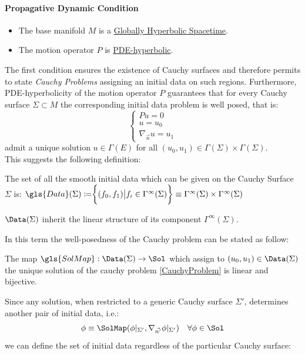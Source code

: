 \documentclass[Main]{subfiles}
\begin{document}
		\paragraph{Propagative Dynamic Condition}
		\begin{itemize}
			 \item The base manifold $M$ is a \underline{Globally Hyperbolic Spacetime}.
			 \item The motion operator $P$ is \underline{PDE-hyperbolic}.
		\end{itemize}
		The first condition ensures the existence of Cauchy surfaces and therefore permits to state  \emph{Cauchy Problems} assigning an initial data on such regions.
		Furthermore, PDE-hyperbolicity of the motion operator $P$ guarantees that for every Cauchy surface $\Sigma \subset M$ the corresponding initial data problem is well posed, that is:
			\begin{equation}\label{CauchyProblem}
				\begin{cases} P u = 0 \\ u = u_0 \\ \nabla_{\vec{n}}u= u_1 \end{cases}
			\end{equation}
			admit a unique solution $u\in \Gamma(E)$ for all $(u_0, u_1) \in \Gamma (\Sigma )\times \Gamma (\Sigma )$.
			\\
			This suggests the following definition:
			\begin{notationfix}
				The set of all the smooth initial data which can be given on the Cauchy Surface $\Sigma$ is:
				$\gls{Data}(\Sigma)  \coloneqq \biggr \{ (f_0,f_1) \big \vert f_i \in \Gamma^\infty(\Sigma)\biggr\}  \equiv  \Gamma^\infty(\Sigma) \times \Gamma^\infty(\Sigma)$
			\end{notationfix}
			\begin{observation}
				$\Data(\Sigma)$ inherit the linear structure of its component $ \Gamma^\infty(\Sigma)$.
			\end{observation}	
			In this term the well-posedness of the Cauchy problem can be stated as follow:

			\begin{proposition}
				The map $ 	 \gls{SolMap} : \Data (\Sigma ) \rightarrow \Sol $ which assign to $(u_0, u_1)\in \Data(\Sigma)$ the unique solution of the cauchy problem \ref{CauchyProblem} is linear and bijective.
			\end{proposition}
			
			Since any solution, when restricted to a generic Cauchy surface $\Sigma'$, determines another pair of initial data, i.e.:
			\begin{displaymath}
				\phi \equiv \SolMap (\phi \vert_{\Sigma'}, \nabla_{\vec{n'}}\phi	 \vert_{\Sigma'} )	\quad \forall \phi\in \Sol
			\end{displaymath}						
			we can define the set of initial data regardless of the particular Cauchy surface:			
			
\end{document}
